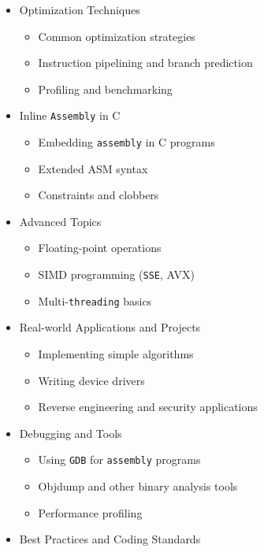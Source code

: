 \documentclass[
]{article}
\providecommand{\tightlist}{%
  \setlength{\itemsep}{0pt}\setlength{\parskip}{0pt}}
\begin{document}
\begin{itemize}
  \begin{itemize}
  \tightlist
  \item
    Static, stack, and heap allocation
  \item
    Using \texttt{malloc} and free from \texttt{assembly}
  \end{itemize}
\item
  Optimization Techniques

  \begin{itemize}
  \tightlist
  \item
    Common optimization strategies
  \item
    Instruction pipelining and branch prediction
  \item
    Profiling and benchmarking
  \end{itemize}
\item
  Inline \texttt{Assembly} in C

  \begin{itemize}
  \tightlist
  \item
    Embedding \texttt{assembly} in C programs
  \item
    Extended ASM syntax
  \item
    Constraints and clobbers
  \end{itemize}
\item
  Advanced Topics

  \begin{itemize}
  \tightlist
  \item
    Floating-point operations
  \item
    SIMD programming (\texttt{SSE}, AVX)
  \item
    Multi-\texttt{threading} basics
  \end{itemize}
\item
  Real-world Applications and Projects

  \begin{itemize}
  \tightlist
  \item
    Implementing simple algorithms
  \item
    Writing device drivers
  \item
    Reverse engineering and security applications
  \end{itemize}
\item
  Debugging and Tools

  \begin{itemize}
  \tightlist
  \item
    Using \texttt{GDB} for \texttt{assembly} programs
  \item
    Objdump and other binary analysis tools
  \item
    Performance profiling
  \end{itemize}
\item
  Best Practices and Coding Standards


\end{itemize}
\end{document}
